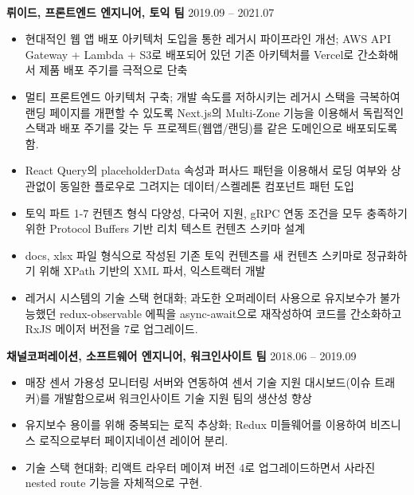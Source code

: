 \documentclass{article}
\begin{document}
\paragraph{\newline \newline}
\textbf{뤼이드, 프론트엔드 엔지니어, 토익 팀} \hfill 2019.09 -- 2021.07
\begin{itemize}
    \setlength\itemsep{0.1em}
    \item 현대적인 웹 앱 배포 아키텍처 도입을 통한 레거시 파이프라인 개선; AWS API Gateway + Lambda + S3로 배포되어 있던 기존 아키텍처를 Vercel로 간소화해서 제품 배포 주기를 극적으로 단축
    \item 멀티 프론트엔드 아키텍처 구축; 개발 속도를 저하시키는 레거시 스택을 극복하여 랜딩 페이지를 개편할 수 있도록 Next.js의 Multi-Zone 기능을 이용해서 독립적인 스택과 배포 주기를 갖는 두 프로젝트(웹앱/랜딩)를 같은 도메인으로 배포되도록 함.
    \item React Query의 placeholderData 속성과 퍼사드 패턴을 이용해서 로딩 여부와 상관없이 동일한 플로우로 그려지는 데이터/스켈레톤 컴포넌트 패턴 도입
     \item 토익 파트 1-7 컨텐츠 형식 다양성, 다국어 지원, gRPC 연동 조건을 모두 충족하기 위한 Protocol Buffers 기반 리치 텍스트 컨텐츠 스키마 설계
     \item docs, xlsx 파일 형식으로 작성된 기존 토익 컨텐츠를 새 컨텐츠 스키마로 정규화하기 위해 XPath 기반의 XML 파서, 익스트랙터 개발
     \item 레거시 시스템의 기술 스택 현대화; 과도한 오퍼레이터 사용으로 유지보수가 불가능했던 redux-observable 에픽을 async-await으로 재작성하여 코드를 간소화하고 RxJS 메이저 버전을 7로 업그레이드.
\end{itemize}

\textbf{채널코퍼레이션, 소프트웨어 엔지니어, 워크인사이트 팀} \hfill 2018.06 -- 2019.09
\begin{itemize}
     \setlength\itemsep{0.1em}
     \item 매장 센서 가용성 모니터링 서버와 연동하여 센서 기술 지원 대시보드(이슈 트래커)를 개발함으로써 워크인사이트 기술 지원 팀의 생산성 향상
     \item 유지보수 용이를 위해 중복되는 로직 추상화; Redux 미들웨어를 이용하여 비즈니스 로직으로부터 페이지네이션 레이어 분리.
     \item 기술 스택 현대화; 리액트 라우터 메이져 버전 4로 업그레이드하면서 사라진 nested route 기능을 자체적으로 구현.
\end{itemize}
\end{document}
